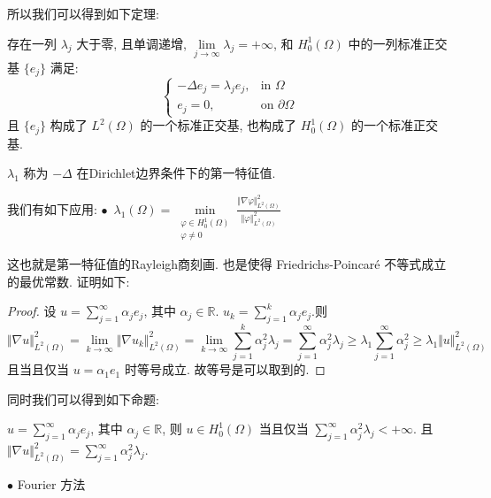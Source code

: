 \documentclass[11pt]{ctexart}[UTF8]
\begin{document}
所以我们可以得到如下定理:
\begin{theorem}
    存在一列 $\lambda_{j}$ 大于零, 且单调递增, $\lim\limits_{j \to \infty} \lambda_j = +\infty$, 和 $H^1_0(\Omega)$ 中的一列标准正交基 $\{ e_j \}$ 满足:
    \begin{equation*}
        \begin{cases}
            -\Delta e_j = \lambda_j e_j, & \text{in } \Omega\\
            e_j = 0, & \text{on } \partial \Omega
        \end{cases}
    \end{equation*}
    且 $\{ e_{j} \}$ 构成了 $L^2(\Omega)$ 的一个标准正交基, 也构成了 $H_0^1(\Omega)$ 的一个标准正交基.
\end{theorem}
\begin{definition}
    $\lambda_{1}$ 称为 $-\Delta$ 在Dirichlet边界条件下的第一特征值.
\end{definition}
我们有如下应用:
$\bullet$\ $\lambda_{1}(\Omega) = \min\limits_{\substack{\varphi \in H_0^1(\Omega)\\ \varphi \neq 0}} \frac{\Vert \nabla \varphi \Vert_{L^2(\Omega)}^2}{\Vert \varphi \Vert_{L^2(\Omega)}^2} $\par
这也就是第一特征值的Rayleigh商刻画. 也是使得 Friedrichs-Poincaré 不等式成立的最优常数. 证明如下:
\begin{proof}
    设 $u = \sum\limits_{j=1}^{\infty} \alpha_j e_j$, 其中 $\alpha_j \in \mathbb{R}$. $u_{k} = \sum\limits_{j=1}^{k} \alpha_j e_j$.则
    \begin{equation*}
        \Vert \nabla u \Vert_{L^2(\Omega)}^2 = \lim\limits_{k \to \infty} \Vert \nabla u_k \Vert_{L^2(\Omega)}^2 = \lim\limits_{k \to \infty} \sum\limits_{j=1}^{k} \alpha_j^2 \lambda_j = \sum\limits_{j=1}^{\infty} \alpha_j^2 \lambda_j\geq \lambda_1 \sum\limits_{j=1}^{\infty} \alpha_j^2 \geq \lambda_1 \Vert u \Vert_{L^2(\Omega)}^2
    \end{equation*}
    且当且仅当 $u = \alpha_1 e_1$ 时等号成立. 故等号是可以取到的.
\end{proof}
同时我们可以得到如下命题:
\begin{proposition}
    $u = \sum\limits_{j=1}^{\infty} \alpha_j e_j$, 其中 $\alpha_j \in \mathbb{R}$, 则 $u \in H_0^1(\Omega)$ 当且仅当 $\sum\limits_{j=1}^{\infty} \alpha_j^2 \lambda_j < +\infty$.
    且 $\Vert \nabla u \Vert_{L^2(\Omega)}^2 = \sum\limits_{j=1}^{\infty} \alpha_j^2 \lambda_j$.
\end{proposition}
$\bullet$ Fourier 方法\par
\end{document}
